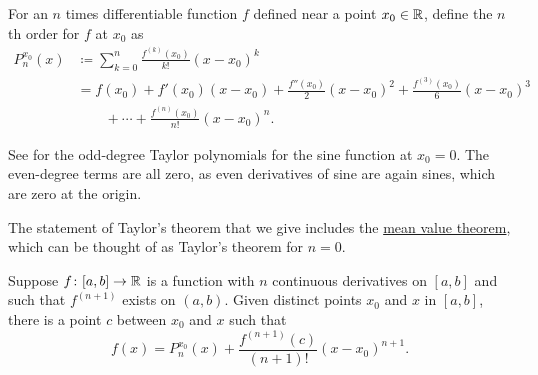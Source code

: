 \begin{defn}
For an $n$ times differentiable function $f$ defined near a point $x_0 \in {\mathbb{R}}$, define the
$n$th order \emph{}%
for $f$ at $x_0$ as
\begin{equation*}
\begin{split}
P_n^{x_0}(x)
& \coloneqq
\sum_{k=0}^n
\frac{f^{(k)}(x_0)}{k!}{(x-x_0)}^k
\\
& =
f(x_0)
+ f'(x_0)(x-x_0)
+ \frac{f''(x_0)}{2}{(x-x_0)}^2
+ \frac{f^{(3)}(x_0)}{6}{(x-x_0)}^3
\\
& \qquad
+ \cdots
+ \frac{f^{(n)}(x_0)}{n!}{(x-x_0)}^n .
\end{split}
\end{equation*}
\end{defn}

See  for
the odd-degree Taylor polynomials for the sine function at $x_0=0$.
The even-degree terms are all zero, as even derivatives 
of sine are again sines, which are zero at the origin.
\begin{myfigureht}
\caption{The odd degree Taylor polynomials for the sine
function.\label{fig:taylorsin}}
\end{myfigureht}

The statement of Taylor's theorem that we give includes the
\hyperref[thm:mvt]{mean value theorem}, which can be thought of as
Taylor's theorem for $n=0$.

\begin{thm}[Taylor] \label{thm:taylor}
Suppose $f \colon [a,b] \to {\mathbb{R}}$ is a function with $n$ continuous
derivatives on $[a,b]$ and such that $f^{(n+1)}$ exists on $(a,b)$.
Given distinct points $x_0$ and $x$ in $[a,b]$,
there is a point $c$ between $x_0$
and $x$ such that
\begin{equation*}
f(x)=P_{n}^{x_0}(x)+\frac{f^{(n+1)}(c)}{(n+1)!}{(x-x_0)}^{n+1} .
\end{equation*}
\end{thm}

